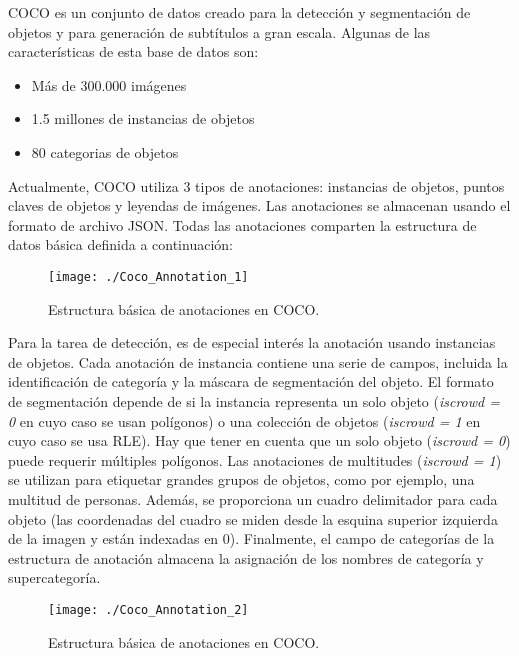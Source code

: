 \documentclass[a4paper, 12pt, oneside]{book}
\begin{document}
COCO es un conjunto de datos creado para la detección y segmentación de objetos y para generación de subtítulos a gran escala. Algunas de las características de esta base de datos son:

\begin{itemize}
\item Más de 300.000 imágenes
\item 1.5 millones de instancias de objetos
\item 80 categorias de objetos
\end{itemize}

Actualmente, COCO utiliza 3 tipos de anotaciones: instancias de objetos, puntos claves de objetos y leyendas de imágenes. Las anotaciones se almacenan usando el formato de archivo JSON. Todas las anotaciones comparten la estructura de datos básica definida a continuación:

\begin{figure}[H]
\begin{center}
\texttt{[image: ./Coco\_Annotation\_1]}
\caption{Estructura básica de anotaciones en COCO.}
\end{center}
\end{figure}

Para la tarea de detección, es de especial interés la anotación usando instancias de objetos. Cada anotación de instancia contiene una serie de campos, incluida la identificación de categoría y la máscara de segmentación del objeto. El formato de segmentación depende de si la instancia representa un solo objeto (\textit{iscrowd = 0} en cuyo caso se usan polígonos) o una colección de objetos (\textit{iscrowd = 1} en cuyo caso se usa RLE). Hay que tener en cuenta que un solo objeto (\textit{iscrowd = 0}) puede requerir múltiples polígonos. Las anotaciones de multitudes (\textit{iscrowd = 1}) se utilizan para etiquetar grandes grupos de objetos, como por ejemplo, una multitud de personas. Además, se proporciona un cuadro delimitador para cada objeto (las coordenadas del cuadro se miden desde la esquina superior izquierda de la imagen y están indexadas en 0). Finalmente, el campo de categorías de la estructura de anotación almacena la asignación de los nombres de categoría y supercategoría.

\begin{figure}[H]
\begin{center}
\texttt{[image: ./Coco\_Annotation\_2]}
\caption{Estructura básica de anotaciones en COCO.}
\label{AnnotacionesCoco2}
\end{center}
\end{figure}
\end{document}
